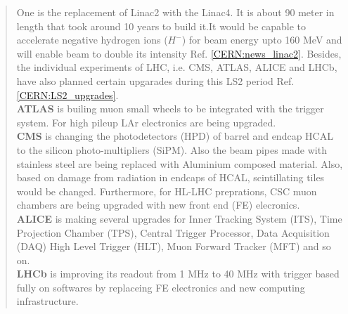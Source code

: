 \begin{abstract}
One is the replacement of Linac2 with the Linac4. It is about 90 meter in length that took around 10 years to build it.It would be capable to accelerate negative hydrogen ions ($H^{-}$) for beam energy upto 160 MeV and will enable beam to double its intensity Ref. \ref{CERN:news_linac2}. %
Besides, the individual experiments of LHC, i.e. CMS, ATLAS, ALICE and LHCb, have also planned certain upgarades during this LS2 period Ref. \ref{CERN:LS2_upgrades}.\\ %
\textbf{ATLAS} is builing muon small wheels to be integrated with the trigger system. For high pileup LAr electronics are being upgraded. \\
\textbf{CMS} is changing the photodetectors (HPD) of barrel and endcap HCAL to the silicon photo-multipliers (SiPM). Also the beam pipes made with stainless steel are being replaced with Aluminium composed material. Also, based on damage from radiation in endcaps of HCAL, scintillating tiles would be changed. Furthermore, for HL-LHC preprations, CSC muon chambers are being upgraded with new front end (FE) elecronics.\\
\textbf{ALICE} is making several upgrades for Inner Tracking System (ITS), Time Projection Chamber (TPS), Central Trigger Processor, Data Acquisition (DAQ) High Level Trigger (HLT), Muon Forward Tracker (MFT) and so on. \\
\textbf{LHCb} is improving its readout from 1 MHz to 40 MHz with trigger based fully on softwares by replaceing FE electronics and new computing infrastructure.


\end{abstract}

